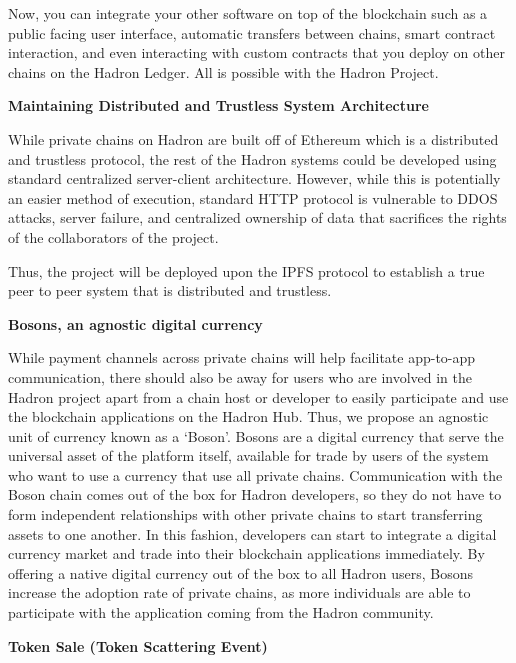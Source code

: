 \documentclass{%
	article}
\begin{document}
Now, you can integrate your other software on top of the blockchain such as a public facing user interface, automatic transfers between chains, smart contract interaction, and even interacting with custom contracts that you deploy on other chains on the Hadron Ledger. All is possible with the Hadron Project.

\begin{center}
\textbf{Maintaining Distributed and Trustless System Architecture}
\end{center}

While private chains on Hadron are built off of Ethereum which is a distributed and trustless protocol, the rest of the Hadron systems could be developed using standard centralized server-client architecture. However, while this is potentially an easier method of execution, standard HTTP protocol is vulnerable to DDOS attacks, server failure, and centralized ownership of data that sacrifices the rights of the collaborators of the project.

Thus, the project will be deployed upon the IPFS protocol to establish a true peer to peer system that is distributed and trustless.

\begin{center}
\textbf{Bosons, an agnostic digital currency}
\end{center}

While payment channels across private chains will help facilitate app-to-app communication, there should also be away for users who are involved in the Hadron project apart from a chain host or developer to easily participate and use the blockchain applications on the Hadron Hub. Thus, we propose an agnostic unit of currency known as a ‘Boson’. Bosons are a digital currency that serve the universal asset of the platform itself, available for trade by users of the system who want to use a currency that use all private chains. Communication with the Boson chain comes out of the box for Hadron developers, so they do not have to form independent relationships with other private chains to start transferring assets to one another. In this fashion, developers can start to integrate a digital currency market and trade into their blockchain applications immediately. By offering a native digital currency out of the box to all Hadron users, Bosons increase the adoption rate of private chains, as more individuals are able to participate with the application coming from the Hadron community.

\begin{center}
\textbf{Token Sale (Token Scattering Event)}
\end{center}
\end{document}
